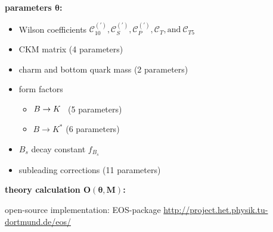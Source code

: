 \documentclass[english]{beamer}
\newcommand{\slide}[2][t]{\begin{frame}[#1] \frametitle{\insertsubsectionhead} #2 \end{frame}}
\begin{document}
\slide{

    {\large\textbf{parameters $\boldsymbol{\theta}$:}}

    \begin{itemize}
        \item Wilson coefficients $\mathcal{C}_{10} ^{(\prime)} , \mathcal{C}_S ^{(\prime)} , \mathcal{C}_P ^{(\prime)} , \mathcal{C}_T , \text{and} ~ \mathcal{C}_{T5}$
        \item CKM matrix (4 parameters)
        \item charm and bottom quark mass (2 parameters)
        \item form factors
              \begin{itemize}
                  \item $B\rightarrow K^{\thinspace\thinspace\thinspace}$ (5 parameters)
                  \item $B\rightarrow K^\ast$                             (6 parameters)
              \end{itemize}
        \item $B_s$ decay constant $f_{B_s}$
        \item subleading corrections (11 parameters)
    \end{itemize}

    \vspace{5mm}

    {\large\textbf{theory calculation $\boldsymbol{O(\theta , M)}$:}}

    \vspace{2.5mm}
    \Large open-source implementation: EOS-package \newline \large \url{http://project.het.physik.tu-dortmund.de/eos/}

}
\end{document}
